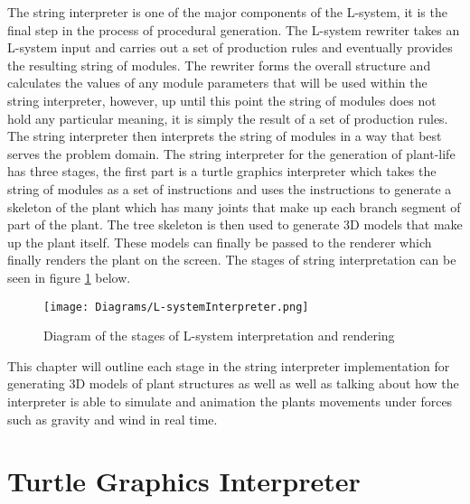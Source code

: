 
\lettrine[lines=3]{T}{}he string interpreter is one of the major components of the L-system, it is the final step in the process of procedural generation. The L-system rewriter takes an L-system input and carries out a set of production rules and eventually provides the resulting string of modules. The rewriter forms the overall structure and calculates the values of any module parameters that will be used within the string interpreter, however, up until this point the string of modules does not hold any particular meaning, it is simply the result of a set of production rules. The string interpreter then interprets the string of modules in a way that best serves the problem domain. The string interpreter for the generation of plant-life has three stages, the first part is a turtle graphics interpreter which takes the string of modules as a set of instructions and uses the instructions to generate a skeleton of the plant which has many joints that make up each branch segment of part of the plant. The tree skeleton is then used to generate 3D models that make up the plant itself. These models can finally be passed to the renderer which finally renders the plant on the screen. The stages of string interpretation can be seen in figure \ref{l-system interpreter} below. 

\begin{figure}[htbp]
	{\centering
		\vspace{7px}
		\texttt{[image: Diagrams/L-systemInterpreter.png]}
		\caption{Diagram of the stages of L-system interpretation and rendering} \label{l-system interpreter}
	}
\end{figure}

This chapter will outline each stage in the string interpreter implementation for generating 3D models of plant structures as well as well as talking about how the interpreter is able to simulate and animation the plants movements under forces such as gravity and wind in real time.

\section{Turtle Graphics Interpreter}

